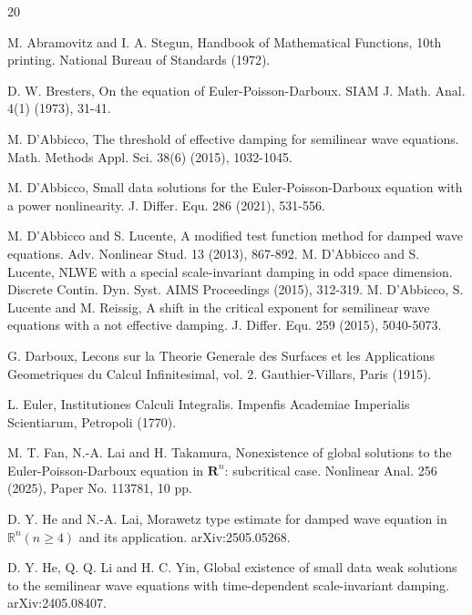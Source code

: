 \documentclass[review]{elsarticle}
\newcommand{\R}{\mathbf{R}}
\begin{document}


\begin{thebibliography}{20}


M. Abramovitz and I. A. Stegun, Handbook of Mathematical Functions, 10th printing. National Bureau of
Standards (1972).

D. W. Bresters, On the equation of Euler-Poisson-Darboux. SIAM J. Math. Anal. 4(1) (1973), 31-41.

M. D'Abbicco, The threshold of effective damping for semilinear wave equations. Math. Methods Appl. Sci. 38(6) (2015), 1032-1045.

M. D'Abbicco, Small data solutions for the Euler-Poisson-Darboux equation with a power nonlinearity.  J. Differ. Equ. 286 (2021), 531-556.

M. D'Abbicco and S. Lucente, A modified test function method for damped wave equations. Adv. Nonlinear Stud. 13
(2013), 867-892.
M. D'Abbicco and S. Lucente, NLWE with a special scale-invariant damping in odd space dimension. Discrete Contin.
Dyn. Syst. AIMS Proceedings (2015), 312-319.
M. D'Abbicco, S. Lucente and M. Reissig, A shift in the critical exponent for semilinear wave equations with a not
effective damping. J. Differ. Equ. 259 (2015), 5040-5073.


G. Darboux, Lecons sur la Theorie Generale des Surfaces et les Applications Geometriques du Calcul Infinitesimal, vol. 2. Gauthier-Villars, Paris (1915).

L. Euler, Institutiones Calculi Integralis. Impenfis Academiae Imperialis Scientiarum, Petropoli (1770).

M. T. Fan, N.-A. Lai and H. Takamura, Nonexistence of global solutions to the
Euler-Poisson-Darboux equation in $\R^n$: subcritical case. Nonlinear Anal. 256 (2025), Paper No. 113781, 10 pp.




D. Y. He and N.-A. Lai,
Morawetz type estimate for damped wave equation in $\mathbb{R}^n (n\geq 4)$ and its application. arXiv:2505.05268.

D. Y. He, Q. Q. Li and H. C. Yin,
Global existence of small data weak solutions to the semilinear wave equations with time-dependent scale-invariant damping. arXiv:2405.08407.


\end{thebibliography}
\end{document}
